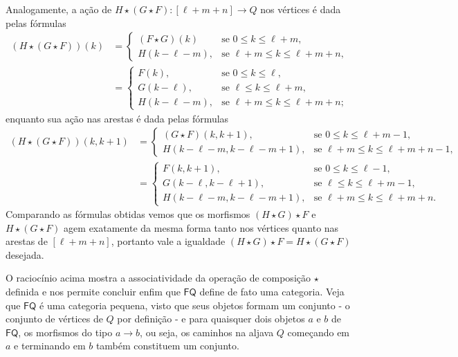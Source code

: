 Analogamente, a ação de $H \star (G \star F): [\ell+m+n] \to Q$ nos vértices é dada pelas fórmulas
\begin{align*}
    (H \star (G \star F))(k)
    & =
    \begin{cases}
        (F \star G)(k) & \text{se } 0 \leq k \leq \ell+m, \\
        H(k-\ell-m), & \text{se } \ell+m \leq k \leq \ell+m+n,
    \end{cases} \\
    & =
    \begin{cases}
        F(k), & \text{se } 0 \leq k \leq \ell, \\
        G(k-\ell), & \text{se } \ell \leq k \leq \ell+m, \\
        H(k-\ell-m), & \text{se } \ell+m \leq k \leq \ell+m+n;
    \end{cases}
\end{align*}
enquanto sua ação nas arestas é dada pelas fórmulas
\begin{align*}
    (H \star (G \star F))(k,k+1)
    & =
    \begin{cases}
        (G \star F)(k,k+1), & \text{se } 0 \leq k \leq \ell+m-1, \\
        H(k-\ell-m,k-\ell-m+1), & \text{se } \ell+m \leq k \leq \ell+m+n-1,
    \end{cases} \\
    & =
    \begin{cases}
        F(k,k+1), & \text{se } 0 \leq k \leq \ell-1, \\
        G(k-\ell,k-\ell+1), & \text{se } \ell \leq k \leq \ell+m-1, \\
        H(k-\ell-m,k-\ell-m+1), & \text{se } \ell+m \leq k \leq \ell+m+n.
    \end{cases}
\end{align*}
Comparando as fórmulas obtidas vemos que os morfismos $(H \star G) \star F$ e $H \star (G \star F)$ agem exatamente da mesma forma tanto nos vértices quanto nas arestas de $[\ell+m+n]$, portanto vale a igualdade $(H \star G) \star F = H \star (G \star F)$ desejada.

O raciocínio acima mostra a associatividade da operação de composição $\star$ definida e nos permite concluir enfim que $\mathsf{FQ}$ define de fato uma categoria.
Veja que $\mathsf{FQ}$ é uma categoria pequena, visto que seus objetos formam um conjunto - o conjunto de vértices de $Q$ por definição -  e para quaisquer dois objetos $a$ e $b$ de $\mathsf{FQ}$, os morfismos do tipo $a \to b$, ou seja, os caminhos na aljava $Q$ começando em $a$ e terminando em $b$ também constituem um conjunto.

